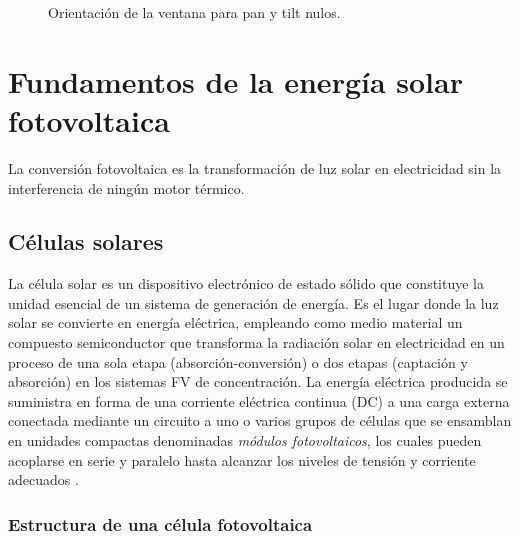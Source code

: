 \begin{figure}[t]
	\centering
	
	\caption{Orientación de la ventana para pan y tilt nulos.}
	\label{fig:plano_ventana}
\end{figure}

\section{Fundamentos de la energía solar fotovoltaica}
La conversión fotovoltaica es la transformación de luz solar en electricidad sin la interferencia de ningún motor térmico.

\subsection{Células solares}

La célula solar es un dispositivo electrónico de estado sólido que constituye la unidad esencial de un sistema de generación de energía. Es el lugar donde la luz solar se convierte en energía eléctrica, empleando como medio material un compuesto semiconductor que transforma la radiación solar en electricidad en un proceso de una sola etapa (absorción-conversión) o dos etapas (captación y absorción) en los sistemas FV de concentración.
La energía eléctrica producida se suministra en forma de una corriente eléctrica continua (DC) a una carga externa conectada mediante un circuito a uno o varios grupos de células que se ensamblan en unidades compactas denominadas \textit{módulos fotovoltaicos}, los cuales pueden acoplarse en serie y paralelo hasta alcanzar los niveles de tensión y corriente adecuados \cite{eoi2008}.


\subsubsection{Estructura de una célula fotovoltaica}

